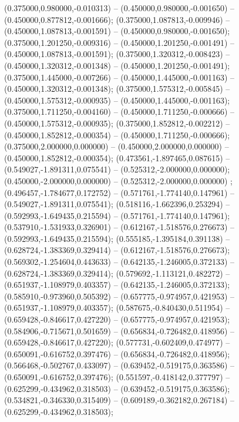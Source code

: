  (0.375000,0.980000,-0.010313) -- (0.450000,0.980000,-0.001650) -- (0.450000,0.877812,-0.001666);
 (0.375000,1.087813,-0.009946) -- (0.450000,1.087813,-0.001591) -- (0.450000,0.980000,-0.001650);
 (0.375000,1.201250,-0.009316) -- (0.450000,1.201250,-0.001491) -- (0.450000,1.087813,-0.001591);
 (0.375000,1.320312,-0.008423) -- (0.450000,1.320312,-0.001348) -- (0.450000,1.201250,-0.001491);
 (0.375000,1.445000,-0.007266) -- (0.450000,1.445000,-0.001163) -- (0.450000,1.320312,-0.001348);
 (0.375000,1.575312,-0.005845) -- (0.450000,1.575312,-0.000935) -- (0.450000,1.445000,-0.001163);
 (0.375000,1.711250,-0.004160) -- (0.450000,1.711250,-0.000666) -- (0.450000,1.575312,-0.000935);
 (0.375000,1.852812,-0.002212) -- (0.450000,1.852812,-0.000354) -- (0.450000,1.711250,-0.000666);
 (0.375000,2.000000,0.000000) -- (0.450000,2.000000,0.000000) -- (0.450000,1.852812,-0.000354);
 (0.473561,-1.897465,0.087615) -- (0.549027,-1.891311,0.075541) -- (0.525312,-2.000000,0.000000);
 (0.450000,-2.000000,0.000000) -- (0.525312,-2.000000,0.000000) ;
 (0.496457,-1.784677,0.172752) -- (0.571761,-1.774140,0.147961) -- (0.549027,-1.891311,0.075541);
 (0.518116,-1.662396,0.253294) -- (0.592993,-1.649435,0.215594) -- (0.571761,-1.774140,0.147961);
 (0.537910,-1.531933,0.326901) -- (0.612167,-1.518576,0.276673) -- (0.592993,-1.649435,0.215594);
 (0.555185,-1.395184,0.391138) -- (0.628724,-1.383369,0.329414) -- (0.612167,-1.518576,0.276673);
 (0.569302,-1.254604,0.443633) -- (0.642135,-1.246005,0.372133) -- (0.628724,-1.383369,0.329414);
 (0.579692,-1.113121,0.482272) -- (0.651937,-1.108979,0.403357) -- (0.642135,-1.246005,0.372133);
 (0.585910,-0.973960,0.505392) -- (0.657775,-0.974957,0.421953) -- (0.651937,-1.108979,0.403357);
 (0.587675,-0.840430,0.511954) -- (0.659428,-0.846617,0.427220) -- (0.657775,-0.974957,0.421953);
 (0.584906,-0.715671,0.501659) -- (0.656834,-0.726482,0.418956) -- (0.659428,-0.846617,0.427220);
 (0.577731,-0.602409,0.474977) -- (0.650091,-0.616752,0.397476) -- (0.656834,-0.726482,0.418956);
 (0.566468,-0.502767,0.433097) -- (0.639452,-0.519175,0.363586) -- (0.650091,-0.616752,0.397476);
 (0.551597,-0.418142,0.377797) -- (0.625299,-0.434962,0.318503) -- (0.639452,-0.519175,0.363586);
 (0.534821,-0.346330,0.315409) -- (0.609189,-0.362182,0.267184) -- (0.625299,-0.434962,0.318503);
